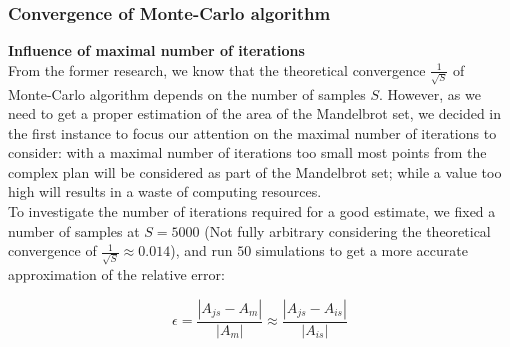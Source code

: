 \documentclass{article}
\begin{document}
    \subsubsection*{Convergence of Monte-Carlo algorithm}

    \textbf{Influence of maximal number of iterations}\\

    From the former research, we know that the theoretical convergence $\frac{1}{\sqrt{S}}$ of Monte-Carlo algorithm depends on the number of samples $S$. However, as we need to get a proper estimation of the area of the Mandelbrot set, we decided in the first instance to focus our attention on the maximal number of iterations to consider: with a maximal number of iterations too small most points from the complex plan will be considered as part of the Mandelbrot set; while a value too high will results in a waste of computing resources.\\
    To investigate the number of iterations required for a good estimate, we fixed a number of samples at $S = 5000$ (Not fully arbitrary considering the theoretical convergence of $\frac{1}{\sqrt{S}} \approx 0.014$), and run $50$ simulations to get a more accurate approximation of the relative error:

    \begin{equation}
        \epsilon = \frac{|A_{js} - A_m|}{|A_m|} \approx \frac{|A_{js} - A_{is}|}{|A_{is}|}
    \end{equation}
\end{document}

